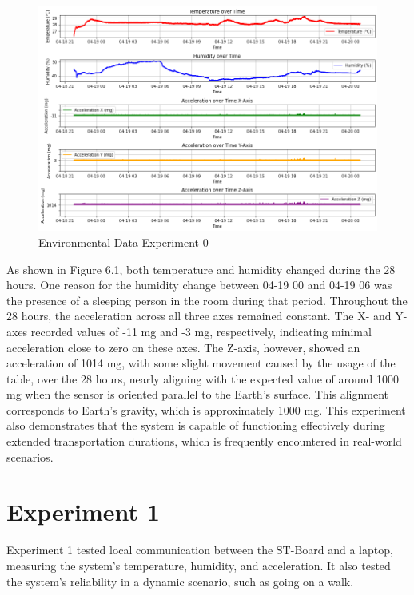\begin{figure}[H]
\centering
\includegraphics[width=1\linewidth]{plot_exp_0.png}
\caption{Environmental Data Experiment 0}
\label{fig:Environmental Data Experiment 0}
\end{figure}

As shown in Figure 6.1, both temperature and humidity changed during the 28 hours. One reason for the humidity change between 04-19 00 and 04-19 06 was the presence of a sleeping person in the room during that period.
Throughout the 28 hours, the acceleration across all three axes remained constant. The X- and Y-axes recorded values of -11 mg and -3 mg, respectively, indicating minimal acceleration close to zero on these axes. The Z-axis, however, showed an acceleration of 1014 mg, with some slight movement caused by the usage of the table, over the 28 hours, nearly aligning with the expected value of around 1000 mg when the sensor is oriented parallel to the Earth's surface. This alignment corresponds to Earth's gravity, which is approximately 1000 mg.
This experiment also demonstrates that the system is capable of functioning effectively during extended transportation durations, which is frequently encountered in real-world scenarios.

\section{Experiment 1}

Experiment 1 tested local communication between the ST-Board and a laptop, measuring the system's temperature, humidity, and acceleration. It also tested the system's reliability in a dynamic scenario, such as going on a walk.

